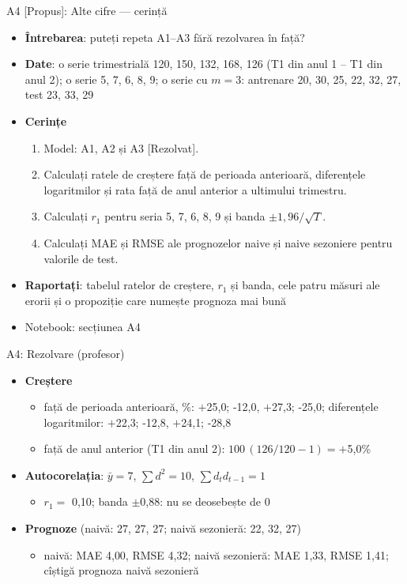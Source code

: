 \begin{frame}{A4 [Propus]: Alte cifre --- cerință}
\itemsize{\footnotesize}
\begin{itemize}
\item \textbf{Întrebarea}: puteți repeta A1--A3 fără rezolvarea în față?
\item \textbf{Date}: o serie trimestrială 120, 150, 132, 168, 126 (T1 din anul 1 -- T1 din anul 2); o serie 5, 7, 6, 8, 9; o serie cu $m = 3$: antrenare 20, 30, 25, 22, 32, 27, test 23, 33, 29
\item \textbf{Cerințe}
\begin{enumerate}
    \item Model: A1, A2 și A3 [Rezolvat].
    \item Calculați ratele de creștere față de perioada anterioară, diferențele logaritmilor și rata față de anul anterior a ultimului trimestru.
    \item Calculați $r_1$ pentru seria 5, 7, 6, 8, 9 și banda $\pm 1{,}96/\sqrt T$.
    \item Calculați MAE și RMSE ale prognozelor naive și naive sezoniere pentru valorile de test.
\end{enumerate}
\item \textbf{Raportați}: tabelul ratelor de creștere, $r_1$ și banda, cele patru măsuri ale erorii și o propoziție care numește prognoza mai bună
\item Notebook: secțiunea A4
\end{itemize}
\end{frame}

\ifsolutions
\begin{frame}{A4: Rezolvare (profesor)}
\itemsize{\footnotesize}
\begin{itemize}
    \item \textbf{Creștere}
    \begin{itemize}
        \item față de perioada anterioară, \%: $+$25{,}0; -12{,}0, $+$27{,}3; -25{,}0; diferențele logaritmilor: $+$22{,}3; -12{,}8, $+$24{,}1; -28{,}8
        \item față de anul anterior (T1 din anul 2): $100\,(126/120 - 1) = +$5{,}0\%
    \end{itemize}
    \item \textbf{Autocorelația}: $\bar y = 7$, $\sum d^2 = 10$, $\sum d_t d_{t-1} = 1$
    \begin{itemize}
        \item $r_1 = $ 0{,}10; banda $\pm$0{,}88: nu se deosebește de 0
    \end{itemize}
    \item \textbf{Prognoze} (naivă: 27, 27, 27; naivă sezonieră: 22, 32, 27)
    \begin{itemize}
        \item naivă: MAE 4{,}00, RMSE 4{,}32; naivă sezonieră: MAE 1{,}33, RMSE 1{,}41; cîștigă prognoza naivă sezonieră
    \end{itemize}
\end{itemize}
\end{frame}
\fi

